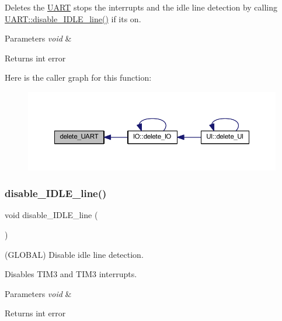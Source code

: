 Deletes the \mbox{\hyperlink{namespace_u_a_r_t}{U\+A\+RT}} stops the interrupts and the idle line detection by calling \mbox{\hyperlink{namespace_u_a_r_t_ade4e159fcbcb9a63bcf9557b23f064df}{U\+A\+R\+T\+::disable\+\_\+\+I\+D\+L\+E\+\_\+line()}} if its on.


\begin{DoxyParams}{Parameters}
{\em void} & \\
\hline
\end{DoxyParams}
\begin{DoxyReturn}{Returns}
int error 
\end{DoxyReturn}
Here is the caller graph for this function\+:\nopagebreak
\begin{figure}[H]
\begin{center}
\leavevmode
\includegraphics[width=350pt]{namespace_u_a_r_t_ab7d8037afb7dff98f21b6a07b3fc2158_icgraph}
\end{center}
\end{figure}
\mbox{\label{namespace_u_a_r_t_ade4e159fcbcb9a63bcf9557b23f064df}} 
\subsubsection{\texorpdfstring{disable\+\_\+\+I\+D\+L\+E\+\_\+line()}{disable\_IDLE\_line()}}
{\footnotesize\ttfamily void disable\+\_\+\+I\+D\+L\+E\+\_\+line (\begin{DoxyParamCaption}\item[{void}]{ }\end{DoxyParamCaption})}



(G\+L\+O\+B\+AL) Disable idle line detection. 

Disables T\+I\+M3 and T\+I\+M3 interrupts.


\begin{DoxyParams}{Parameters}
{\em void} & \\
\hline
\end{DoxyParams}
\begin{DoxyReturn}{Returns}
int error 
\end{DoxyReturn}
\mbox{\label{namespace_u_a_r_t_a92da5727d9a24141d77c8acb1fc776d0}} 
